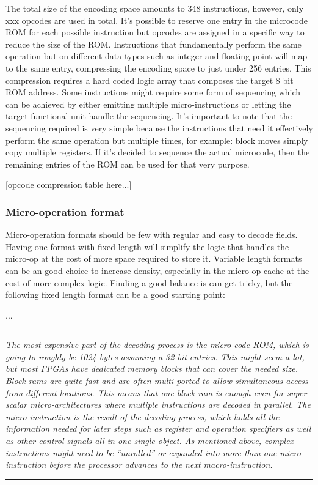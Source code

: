 \documentclass{article}
\begin{document}
                The total size of the encoding space amounts to 348 instructions, however, only xxx opcodes are used in total. It's possible to reserve one entry in the microcode ROM for each possible instruction but opcodes are assigned in a specific way to reduce the size of the ROM. Instructions that fundamentally perform the same operation but on different data types such as integer and floating point will map to the same entry, compressing the encoding space to just under 256 entries. This compression requires a hard coded logic array that composes the target 8 bit ROM address. Some instructions might require some form of sequencing which can be achieved by either emitting multiple micro-instructions or letting the target functional unit handle the sequencing. It's important to note that the sequencing required is very simple because the instructions that need it effectively perform the same operation but multiple times, for example: block moves simply copy multiple registers. If it's decided to sequence the actual microcode, then the remaining entries of the ROM can be used for that very purpose.

                [opcode compression table here...]

            \subsubsection{Micro-operation format}

                Micro-operation formats should be few with regular and easy to decode fields. Having one format with fixed length will simplify the logic that handles the micro-op at the cost of more space required to store it. Variable length formats can be an good choice to increase density, especially in the micro-op cache at the cost of more complex logic. Finding a good balance is can get tricky, but the following fixed length format can be a good starting point:

                ...

        \par\noindent\rule{\textwidth}{0.4pt}
        \textit{The most expensive part of the decoding process is the micro-code ROM, which is going to roughly be 1024 bytes assuming a 32 bit entries. This might seem a lot, but most FPGAs have dedicated memory blocks that can cover the needed size. Block rams are quite fast and are often multi-ported to allow simultaneous access from different locations. This means that one block-ram is enough even for super-scalar micro-architectures where multiple instructions are decoded in parallel. The micro-instruction is the result of the decoding process, which holds all the information needed for later steps such as register and operation specifiers as well as other control signals all in one single object. As mentioned above, complex instructions might need to be ``unrolled'' or expanded into more than one micro-instruction before the processor advances to the next macro-instruction.}
        \par\noindent\rule{\textwidth}{0.4pt}
\end{document}
